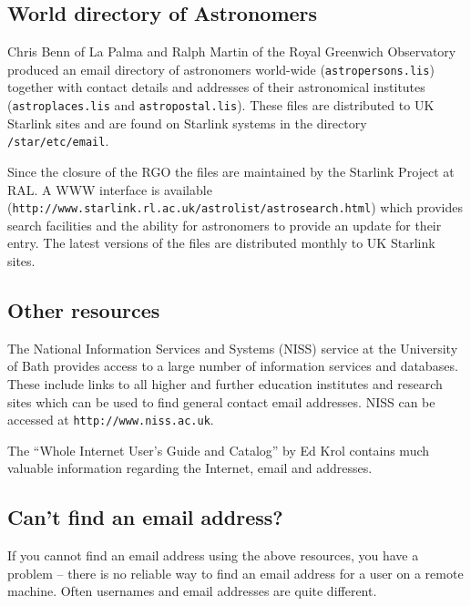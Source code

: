 \documentclass[twoside,11pt]{article}
\newcommand{\htmladdnormallink}[2]{#1}
\newcommand{\latex}[1]{#1}
\newcommand{\xlabel}[1]{}
\renewcommand{\_}{\texttt{\symbol{95}}}
\begin{document}
\subsection{\xlabel{world_directory_of_astronomers}World directory of
Astronomers} \label{world_directory_of_astronomers}

Chris Benn of La Palma and Ralph Martin of the Royal Greenwich
Observatory produced an email directory of astronomers world-wide
(\texttt{astropersons.lis}) together with contact details and addresses
of their astronomical institutes (\texttt{astroplaces.lis} and
\texttt{astropostal.lis}).  These files are distributed to UK Starlink 
sites and are found on Starlink systems in the
directory \texttt{/star/etc/email}.

Since the closure of the RGO the files are maintained by the
Starlink Project at RAL.  A \htmladdnormallink{WWW interface is
available}{http://www.starlink.rl.ac.uk/astrolist/astrosearch.html}
\latex{(\texttt{http://www.starlink.rl.ac.uk/astrolist/astrosearch.html})}
which provides search facilities and the ability for astronomers to
provide an update for their entry.  The latest versions of the files are
distributed monthly to UK Starlink sites.

\subsection{\xlabel{other_resources}Other resources}
\label{other_resources}

The National Information Services and Systems (NISS) service at the 
University of Bath provides access to a large number of information 
services and databases.  These include links to all higher and further
education institutes and research sites which can be used to find general
contact email addresses.  NISS can be accessed at
\htmladdnormallink{\texttt{http://www.niss.ac.uk}}{http://www.niss.ac.uk}.

The ``Whole Internet User's Guide and Catalog'' by Ed Krol contains
much valuable information regarding the Internet, email and addresses.

\subsection{\xlabel{cant_find_an_email_address}Can't find an email address?}
\label{cant_find_an_email_address}

If you cannot find an email address using the above resources, you have a 
problem -- there is no reliable way to find an email address for a user
on a remote machine.  Often usernames and email addresses are quite different.
\end{document}
